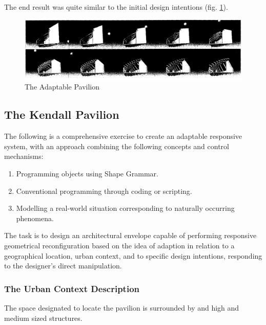 The end result was quite similar to the initial design intentions (fig. \ref{fig:FinalPav}).

\begin{figure}[htbp]
\centering
\includegraphics[width=\textwidth]{./Images/7-FinalPavilion}
\caption[Adaptable Pavilion Design Results]{The Adaptable Pavilion \cite{zulas04}}
\label{fig:FinalPav}
\end{figure}

\newpage
\subsection{The Kendall Pavilion}

The following is a comprehensive exercise to create an adaptable responsive system, with an approach combining the following concepts and control mechanisms:

\begin{enumerate}
\item Programming objects using Shape Grammar.
\item Conventional programming through coding or scripting.
\item Modelling a real-world situation corresponding to naturally occurring phenomena.
\end{enumerate}

The task is to design an architectural envelope capable of performing responsive geometrical reconfiguration based on the idea of adaption in relation to a geographical location, urban context, and to specific design intentions, responding to the designer's direct manipulation.

\subsubsection{The Urban Context Description}

The space designated to locate the pavilion is surrounded by and high and medium sized structures.

